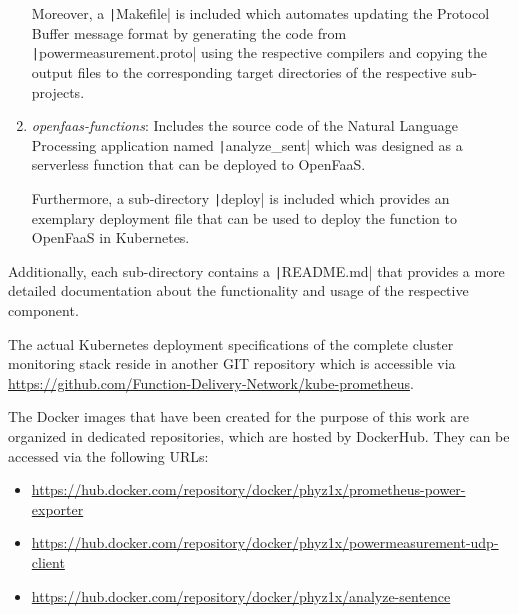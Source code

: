 \begin{enumerate}
    Moreover, a \texttt|Makefile| is included which automates updating the Protocol Buffer message format by generating the code from \texttt|powermeasurement.proto| using the respective compilers and copying the output files to the corresponding target directories of the respective sub-projects. 
    
    \item \textit{openfaas-functions}: Includes the source code of the Natural Language Processing application named \texttt|analyze_sent| which was designed as a serverless function that can be deployed to OpenFaaS.
    
    Furthermore, a sub-directory \texttt|deploy| is included which provides an exemplary deployment file that can be used to deploy the function to OpenFaaS in Kubernetes.
\end{enumerate}

Additionally, each sub-directory contains a \texttt|README.md| that provides a more detailed documentation about the functionality and usage of the respective component.


The actual Kubernetes deployment specifications of the complete cluster monitoring stack reside in another GIT repository which is accessible via \url{https://github.com/Function-Delivery-Network/kube-prometheus}.

The Docker images that have been created for the purpose of this work are organized in dedicated repositories, which are hosted by DockerHub. They can be accessed via the following URLs:

\begin{itemize}
    \item \url{https://hub.docker.com/repository/docker/phyz1x/prometheus-power-exporter}
    \item \url{https://hub.docker.com/repository/docker/phyz1x/powermeasurement-udp-client}
    \item \url{https://hub.docker.com/repository/docker/phyz1x/analyze-sentence}
\end{itemize}